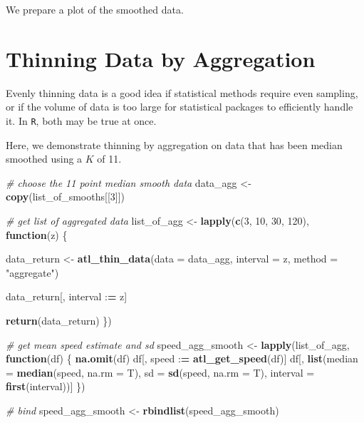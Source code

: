 \documentclass[
]{scrreprt}
\newenvironment{Shaded}{}{}
\newcommand{\CommentTok}[1]{\textcolor[rgb]{0.38,0.63,0.69}{\textit{#1}}}
\newcommand{\ControlFlowTok}[1]{\textcolor[rgb]{0.00,0.44,0.13}{\textbf{#1}}}
\newcommand{\DataTypeTok}[1]{\textcolor[rgb]{0.56,0.13,0.00}{#1}}
\newcommand{\DecValTok}[1]{\textcolor[rgb]{0.25,0.63,0.44}{#1}}
\newcommand{\ErrorTok}[1]{\textcolor[rgb]{1.00,0.00,0.00}{\textbf{#1}}}
\newcommand{\KeywordTok}[1]{\textcolor[rgb]{0.00,0.44,0.13}{\textbf{#1}}}
\newcommand{\NormalTok}[1]{#1}
\newcommand{\OperatorTok}[1]{\textcolor[rgb]{0.40,0.40,0.40}{#1}}
\newcommand{\StringTok}[1]{\textcolor[rgb]{0.25,0.44,0.63}{#1}}
\begin{document}
We prepare a plot of the smoothed data.

\hypertarget{thinning-data-by-aggregation}{%
\section{Thinning Data by Aggregation}\label{thinning-data-by-aggregation}}

Evenly thinning data is a good idea if statistical methods require even sampling, or if the volume of data is too large for statistical packages to efficiently handle it. In \texttt{R}, both may be true at once.

Here, we demonstrate thinning by aggregation on data that has been median smoothed using a \(K\) of 11.

\begin{Shaded}
\begin{Highlighting}[]
\CommentTok{\# choose the 11 point median smooth data}
\NormalTok{data\_agg <{-}}\StringTok{ }\KeywordTok{copy}\NormalTok{(list\_of\_smooths[[}\DecValTok{3}\NormalTok{]])}

\CommentTok{\# get list of aggregated data}
\NormalTok{list\_of\_agg <{-}}\StringTok{ }\KeywordTok{lapply}\NormalTok{(}\KeywordTok{c}\NormalTok{(}\DecValTok{3}\NormalTok{, }\DecValTok{10}\NormalTok{, }\DecValTok{30}\NormalTok{, }\DecValTok{120}\NormalTok{), }\ControlFlowTok{function}\NormalTok{(z) \{}
  
\NormalTok{  data\_return <{-}}\StringTok{ }\KeywordTok{atl\_thin\_data}\NormalTok{(}\DataTypeTok{data =}\NormalTok{ data\_agg,}
                            \DataTypeTok{interval =}\NormalTok{ z,}
                            \DataTypeTok{method =} \StringTok{"aggregate"}\NormalTok{)}
  
\NormalTok{  data\_return[, interval }\OperatorTok{:}\ErrorTok{=}\StringTok{ }\NormalTok{z]}
  
  \KeywordTok{return}\NormalTok{(data\_return)}
\NormalTok{\})}

\CommentTok{\# get mean speed estimate and sd}
\NormalTok{speed\_agg\_smooth <{-}}\StringTok{ }
\StringTok{  }\KeywordTok{lapply}\NormalTok{(list\_of\_agg, }\ControlFlowTok{function}\NormalTok{(df) \{}
    \KeywordTok{na.omit}\NormalTok{(df)}
\NormalTok{    df[, speed }\OperatorTok{:}\ErrorTok{=}\StringTok{ }\KeywordTok{atl\_get\_speed}\NormalTok{(df)]}
\NormalTok{    df[, }\KeywordTok{list}\NormalTok{(}\DataTypeTok{median =} \KeywordTok{median}\NormalTok{(speed, }\DataTypeTok{na.rm =}\NormalTok{ T),}
              \DataTypeTok{sd =} \KeywordTok{sd}\NormalTok{(speed, }\DataTypeTok{na.rm =}\NormalTok{ T),}
              \DataTypeTok{interval =} \KeywordTok{first}\NormalTok{(interval))]}
\NormalTok{  \})}

\CommentTok{\# bind}
\NormalTok{speed\_agg\_smooth <{-}}\StringTok{ }\KeywordTok{rbindlist}\NormalTok{(speed\_agg\_smooth)}
\end{Highlighting}
\end{Shaded}
\end{document}
